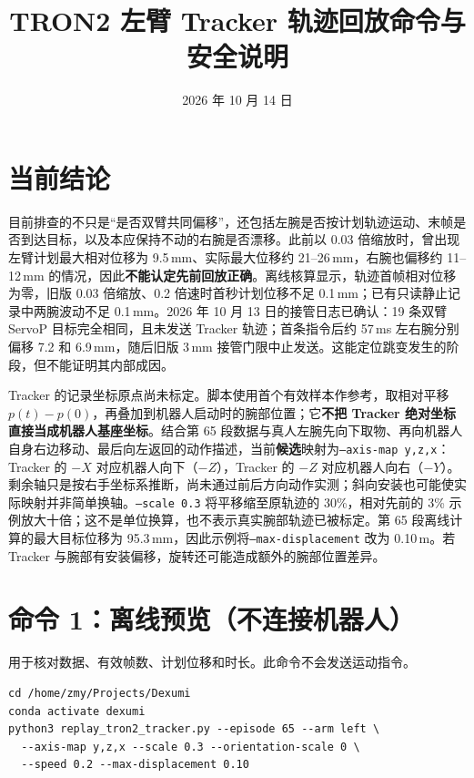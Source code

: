\documentclass[UTF8,a4paper,11pt]{ctexart}
\title{TRON2 左臂 Tracker 轨迹回放命令与安全说明}
\date{2026 年 10 月 14 日}
\begin{document}
\maketitle

\section*{当前结论}

目前排查的不只是“是否双臂共同偏移”，还包括左腕是否按计划轨迹运动、末帧是否到达目标，以及本应保持不动的右腕是否漂移。此前以 0.03 倍缩放时，曾出现左臂计划最大相对位移为 9.5\,mm、实际最大位移约 21--26\,mm，右腕也偏移约 11--12\,mm 的情况，因此\textbf{不能认定先前回放正确}。离线核算显示，轨迹首帧相对位移为零，旧版 0.03 倍缩放、0.2 倍速时首秒计划位移不足 0.1\,mm；已有只读静止记录中两腕波动不足 0.1\,mm。2026 年 10 月 13 日的接管日志已确认：19 条双臂 ServoP 目标完全相同，且未发送 Tracker 轨迹；首条指令后约 57\,ms 左右腕分别偏移 7.2 和 6.9\,mm，随后旧版 3\,mm 接管门限中止发送。这能定位跳变发生的阶段，但不能证明其内部成因。

Tracker 的记录坐标原点尚未标定。脚本使用首个有效样本作参考，取相对平移 $p(t)-p(0)$，再叠加到机器人启动时的腕部位置；它\textbf{不把 Tracker 绝对坐标直接当成机器人基座坐标}。结合第 65 段数据与真人左腕先向下取物、再向机器人自身右边移动、最后向左返回的动作描述，当前\textbf{候选}映射为\texttt{--axis-map y,z,x}：Tracker 的 $-X$ 对应机器人向下（$-Z$），Tracker 的 $-Z$ 对应机器人向右（$-Y$）。剩余轴只是按右手坐标系推断，尚未通过前后方向动作实测；斜向安装也可能使实际映射并非简单换轴。\texttt{--scale 0.3} 将平移缩至原轨迹的 30\%，相对先前的 3\% 示例放大十倍；这不是单位换算，也不表示真实腕部轨迹已被标定。第 65 段离线计算的最大目标位移为 95.3\,mm，因此示例将\texttt{--max-displacement} 改为 0.10\,m。若 Tracker 与腕部有安装偏移，旋转还可能造成额外的腕部位置差异。

\section*{命令 1：离线预览（不连接机器人）}

用于核对数据、有效帧数、计划位移和时长。此命令不会发送运动指令。

\begin{verbatim}
cd /home/zmy/Projects/Dexumi
conda activate dexumi
python3 replay_tron2_tracker.py --episode 65 --arm left \
  --axis-map y,z,x --scale 0.3 --orientation-scale 0 \
  --speed 0.2 --max-displacement 0.10
\end{verbatim}
\end{document}
